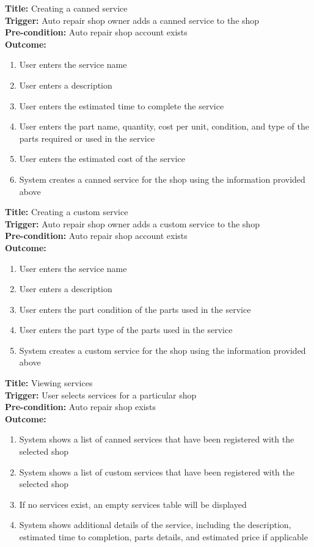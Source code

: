 \documentclass[12pt]{article}
\begin{document}
\textbf{Title:} Creating a canned service\\
\textbf{Trigger:} Auto repair shop owner adds a canned service to the shop\\
\textbf{Pre-condition:} Auto repair shop account exists\\
\textbf{Outcome:}
\begin{enumerate}
	\item User enters the service name
	\item User enters a description
	\item User enters the estimated time to complete the service
	\item User enters the part name, quantity, cost per unit, condition, and type of the parts required or
	      used in the service
	\item User enters the estimated cost of the service
	\item System creates a canned service for the shop using the information provided above
\end{enumerate}

\textbf{Title:} Creating a custom service\\
\textbf{Trigger:} Auto repair shop owner adds a custom service to the shop\\
\textbf{Pre-condition:} Auto repair shop account exists\\
\textbf{Outcome:}
\begin{enumerate}
	\item User enters the service name
	\item User enters a description
	\item User enters the part condition of the parts used in the service
	\item User enters the part type of the parts used in the service
	\item System creates a custom service for the shop using the information provided above
\end{enumerate}

\textbf{Title:} Viewing services\\
\textbf{Trigger:} User selects services for a particular shop\\
\textbf{Pre-condition:} Auto repair shop exists\\
\textbf{Outcome:}
\begin{enumerate}
	\item System shows a list of canned services that have been registered with the selected shop
	\item System shows a list of custom services that have been registered with the selected shop
	\item If no services exist, an empty services table will be displayed
	\item System shows additional details of the service, including the description, estimated time to
	      completion, parts details, and estimated price if applicable
\end{enumerate}
\end{document}
